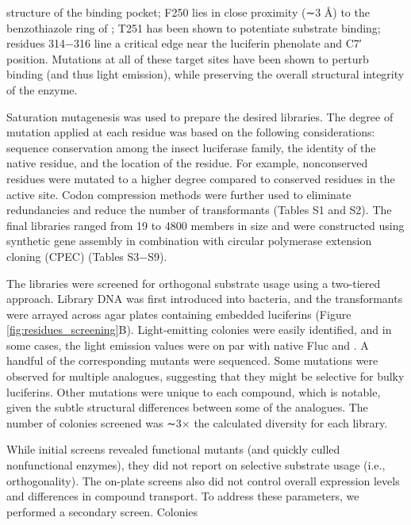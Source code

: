 structure of the binding pocket;\cite{BRANCHINI:2001gr} F250 lies in close proximity
(∼3 Å) to the benzothiazole ring of \dluciferin{}; T251 has been
shown to potentiate substrate binding;\cite{Branchini:2003kt} residues 314−316 line
a critical edge near the luciferin phenolate and C7′ position.
Mutations at all of these target sites have been shown to perturb \dluciferin{} binding (and thus light emission), while
preserving the overall structural integrity of the enzyme.\cite{Branchini:2007bw, Branchini:2003kt, Viviani:2013ej}
\par
Saturation mutagenesis was used to prepare the desired
libraries. The degree of mutation applied at each residue was
based on the following considerations: sequence conservation
among the insect luciferase family, the identity of the native
residue, and the location of the residue. For example,
nonconserved residues were mutated to a higher degree
compared to conserved residues in the active site. Codon
compression methods were further used to eliminate
redundancies and reduce the number of transformants (Tables
S1 and S2).\cite{Pines:2014he} The final libraries ranged from 19 to 4800
members in size and were constructed using synthetic gene
assembly\cite{Ness:2002cc} in combination with circular polymerase
extension
cloning (CPEC) (Tables S3−S9).\cite{Quan:2011fa} %
\par
The libraries were screened for orthogonal substrate usage
using a two-tiered approach. Library DNA was first introduced
into bacteria, and the transformants were arrayed across agar
plates containing embedded luciferins (Figure \ref{fig:residues_screening}B). Light-emitting
colonies were easily identified, and in
some cases, the light emission values were on par with native
Fluc and \dluciferin{}. A handful of the
corresponding mutants were sequenced. Some mutations
were observed for multiple analogues, suggesting that they
might be selective for bulky luciferins. Other
mutations were unique to each compound, which is notable,
given the subtle structural differences between some of the
analogues. The number of colonies screened was ∼3× the
calculated diversity for each library.
\par
While initial screens revealed functional mutants (and
quickly culled nonfunctional enzymes), they did not report
on selective substrate usage (i.e., orthogonality). The on-plate
screens also did not control overall expression levels and
differences in compound transport. To address these
parameters, we performed a secondary screen. Colonies
